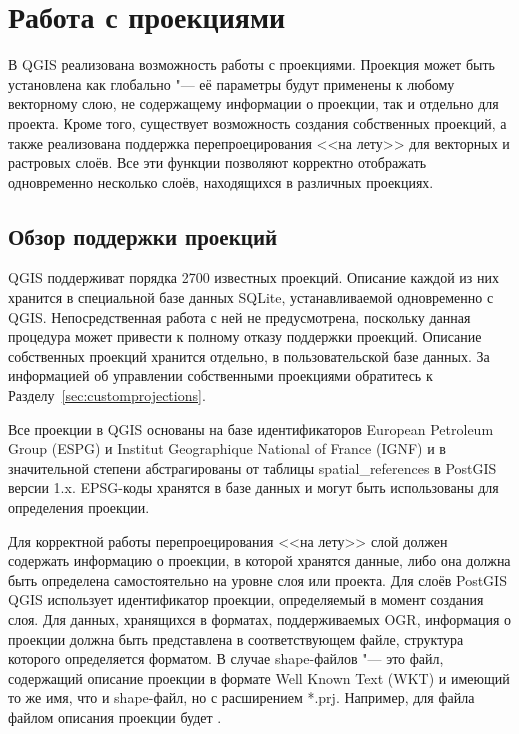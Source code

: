 
\chapter{Работа с проекциями}\label{label_projections}


В QGIS реализована возможность работы с проекциями. Проекция может быть
установлена как глобально "--- её параметры будут применены к любому
векторному слою, не содержащему информации о проекции, так и отдельно для
проекта. Кроме того, существует возможность создания собственных проекций,
а также реализована поддержка перепроецирования <<на лету>> для векторных
и растровых слоёв. Все эти функции позволяют корректно отображать
одновременно несколько слоёв, находящихся в различных проекциях.

\section{Обзор поддержки проекций}\label{label_projoverview}

QGIS поддерживат порядка 2700 известных проекций. Описание каждой из них
хранится в специальной базе данных SQLite, устанавливаемой одновременно
с QGIS. Непосредственная работа с ней не предусмотрена, поскольку данная
процедура может привести к полному отказу поддержки проекций. Описание
собственных проекций хранится отдельно, в пользовательской базе данных.
За информацией об управлении собственными проекциями обратитесь к
Разделу~\ref{sec:customprojections}.

Все проекции в QGIS основаны на базе идентификаторов European Petroleum
Group (ESPG) и Institut Geographique National of France (IGNF)
и в значительной степени абстрагированы от таблицы spatial\_references в
PostGIS версии 1.x. EPSG-коды хранятся в базе данных и
могут быть использованы для определения проекции.

Для корректной работы перепроецирования <<на лету>> слой должен содержать
информацию о проекции, в которой хранятся данные, либо она должна быть
определена самостоятельно на уровне слоя или проекта. Для слоёв PostGIS
QGIS использует идентификатор проекции, определяемый в момент создания
слоя. Для данных, хранящихся в форматах, поддерживаемых OGR, информация
о проекции должна быть представлена в соответствующем файле, структура которого
определяется форматом. В случае shape-файлов "--- это файл, содержащий описание
проекции в формате Well Known Text (WKT) и имеющий то же имя,
что и shape-файл, но с расширением *.prj. Например, для файла 
файлом описания проекции будет .

